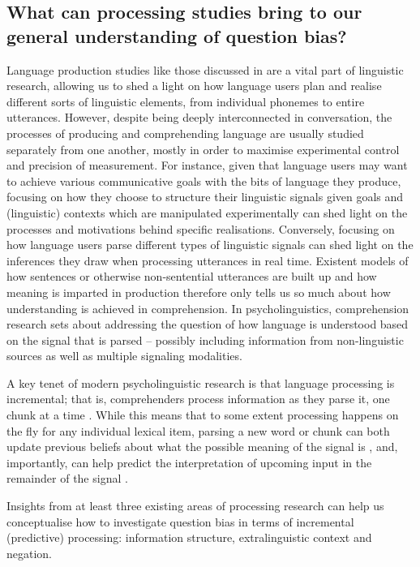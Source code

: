 \documentclass[output=paper,colorlinks,citecolor=brown]{langscibook}
\begin{document}
\subsection{What can processing studies bring to our general understanding of question bias?}\label{processgeneral}

Language production studies like those discussed in  are a vital part of linguistic research, allowing us to shed a light on how language users plan and realise different sorts of linguistic elements, from individual phonemes to entire utterances. However, despite being deeply interconnected in conversation, the processes of producing and comprehending language are usually studied separately from one another, mostly in order to maximise experimental control and precision of measurement. For instance, given that language users may want to achieve various communicative goals with the bits of language they produce, focusing on how they choose to structure their linguistic signals given goals and (linguistic) contexts which are manipulated experimentally can shed light on the processes and motivations behind specific realisations. Conversely, focusing on how language users parse different types of linguistic signals can shed light on the inferences they draw when processing utterances in real time. Existent models of how sentences or otherwise non-sentential utterances are built up and how meaning is imparted in production therefore only tells us so much about how understanding is achieved in comprehension. In psycholinguistics, comprehension research sets about addressing the question of how language is understood based on the signal that is parsed -- possibly including information from non-linguistic sources as well as multiple signaling modalities. 

A key tenet of modern psycholinguistic research is that language processing is incremental; that is, comprehenders process information as they parse it, one chunk at a time \citep{altmann_1988}. While this means that to some extent processing happens on the fly for any individual lexical item, parsing a new word or chunk can both update previous beliefs about what the possible meaning of the signal is \citep{Levy2009}, and, importantly, can help predict the interpretation of upcoming input in the remainder of the signal \citep{Levy2008, Kuperberg2015}.

Insights from at least three existing areas of processing research can help us conceptualise how to investigate question bias in terms of incremental (predictive) processing: information structure, extralinguistic context and negation.
\end{document}
